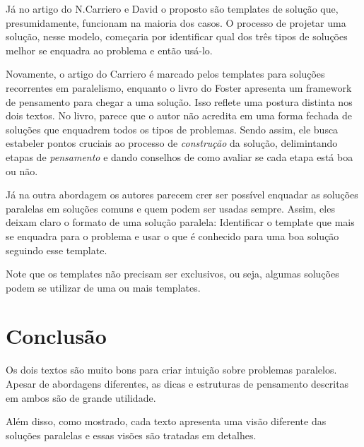 \documentclass[12pt]{article}
\begin{document}
Já no artigo do N.Carriero e David o proposto são templates de solução que,
presumidamente, funcionam na maioria dos casos. O processo de projetar uma solução,
nesse modelo, começaria por identificar qual dos três tipos de soluções melhor 
se enquadra ao problema e então usá-lo. 

Novamente, o artigo do Carriero é marcado pelos templates para soluções
recorrentes em paralelismo, enquanto o livro do Foster apresenta um framework
de pensamento para chegar a uma solução. Isso reflete uma postura
distinta nos dois textos. No livro, parece que o autor não acredita
em uma forma fechada de soluções que enquadrem todos os tipos de problemas. Sendo assim,
ele busca estabeler pontos cruciais ao processo de \emph{construção} da solução, delimintando
etapas de \emph{pensamento} e dando conselhos de como avaliar
se cada etapa está boa ou não.

Já na outra abordagem os autores parecem crer ser possível 
enquadar as soluções paralelas em soluções comuns e quem podem ser usadas sempre.
Assim, eles deixam claro o formato de uma solução paralela: Identificar o template que mais se enquadra
para o problema e usar o que é conhecido para uma boa solução seguindo esse template.

Note que os templates não precisam ser exclusivos, ou seja, algumas soluções podem se
utilizar de uma ou mais templates.
 
\section{Conclusão}

Os dois textos são muito bons para criar intuição sobre
problemas paralelos. Apesar de abordagens diferentes, as dicas e estruturas
de pensamento descritas em ambos são de grande utilidade. 

Além disso, como mostrado, cada texto apresenta uma visão diferente das soluções paralelas e essas visões são tratadas
em detalhes.
 


\end{document}
